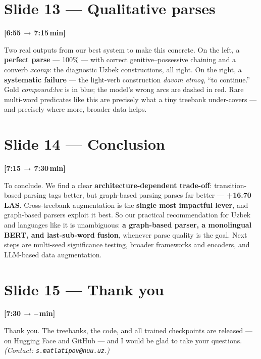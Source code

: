 \documentclass[12pt,a4paper]{article}
\newcommand{\timing}[2]{%
   \par\noindent\textbf{\small [#1\,$\to$\,#2\,min]}\par\vspace{0.2em}}
\newcommand{\say}[1]{\textbf{#1}}
\begin{document}
\section*{Slide 13 --- Qualitative parses}
\timing{6:55}{7:15}

Two real outputs from our best system to make this concrete. On the left,
a \say{perfect parse} --- 100\% --- with correct genitive--possessive
chaining and a converb \textit{xcomp}: the diagnostic Uzbek
constructions, all right. On the right, a \say{systematic failure} --- the
light-verb construction \textit{davom etmoq}, ``to continue.'' Gold
\textit{compound:lvc} is in blue; the model's wrong arcs are dashed in
red. Rare multi-word predicates like this are precisely what a tiny
treebank under-covers --- and precisely where more, broader data helps.

\section*{Slide 14 --- Conclusion}
\timing{7:15}{7:30}

To conclude. We find a clear \say{architecture-dependent trade-off}:
transition-based parsing tags better, but graph-based parsing parses far
better --- \textbf{+16.70 LAS}. Cross-treebank augmentation is the
\say{single most impactful lever}, and graph-based parsers exploit it
best. So our practical recommendation for Uzbek and languages like it is
unambiguous: \say{a graph-based parser, a monolingual BERT, and
last-sub-word fusion}, whenever parse quality is the goal. Next steps are
multi-seed significance testing, broader frameworks and encoders, and
LLM-based data augmentation.

\section*{Slide 15 --- Thank you}
\timing{7:30}{--}

Thank you. The treebanks, the code, and all trained checkpoints are
released --- on Hugging Face and GitHub --- and I would be glad to take
your questions. \textit{(Contact: \texttt{s.matlatipov@nuu.uz}.)}

\newpage
\end{document}
